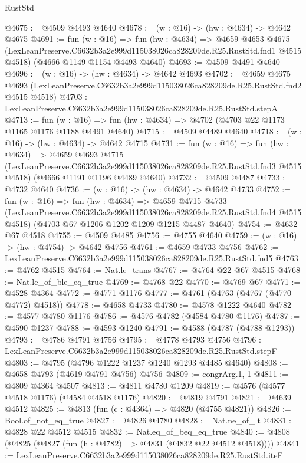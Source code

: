 \begin{lexlean}{RustStd}
\begin{coremodule}
@4675 := @4509 @4493 @4640
@4678 := (w : @16) -> (hw : @4634) -> @4642 @4675
@4691 := fun (w : @16) =>
  fun (hw : @4634) =>
  @4659
    @4653
    @4675
    (LexLeanPreserve.C6632b3a2e999d115038026ca828209de.R25.RustStd.fnd1 @4515 @4518)
    (@4666 @1149 @1154 @4493 @4640)
@4693 := @4509 @4491 @4640
@4696 := (w : @16) -> (hw : @4634) -> @4642 @4693
@4702 := @4659
    @4675
    @4693
    (LexLeanPreserve.C6632b3a2e999d115038026ca828209de.R25.RustStd.fnd2 @4515 @4518)
@4703 := LexLeanPreserve.C6632b3a2e999d115038026ca828209de.R25.RustStd.stepA
@4713 := fun (w : @16) => fun (hw : @4634) => @4702 (@4703 @22 @1173 @1165 @1176 @1188 @4491 @4640)
@4715 := @4509 @4489 @4640
@4718 := (w : @16) -> (hw : @4634) -> @4642 @4715
@4731 := fun (w : @16) =>
  fun (hw : @4634) =>
  @4659
    @4693
    @4715
    (LexLeanPreserve.C6632b3a2e999d115038026ca828209de.R25.RustStd.fnd3 @4515 @4518)
    (@4666 @1191 @1196 @4489 @4640)
@4732 := @4509 @4487
@4733 := @4732 @4640
@4736 := (w : @16) -> (hw : @4634) -> @4642 @4733
@4752 := fun (w : @16) =>
  fun (hw : @4634) =>
  @4659
    @4715
    @4733
    (LexLeanPreserve.C6632b3a2e999d115038026ca828209de.R25.RustStd.fnd4 @4515 @4518)
    (@4703 @67 @1206 @1202 @1209 @1215 @4487 @4640)
@4754 := @4632 @67 @4518
@4755 := @4509 @4485
@4756 := @4755 @4640
@4759 := (w : @16) -> (hw : @4754) -> @4642 @4756
@4761 := @4659 @4733 @4756
@4762 := LexLeanPreserve.C6632b3a2e999d115038026ca828209de.R25.RustStd.fnd5
@4763 := @4762 @4515
@4764 := Nat.le_trans
@4767 := @4764 @22 @67 @4515
@4768 := Nat.le_of_ble_eq_true
@4769 := @4768 @22
@4770 := @4769 @67
@4771 := @4528 @4364
@4772 := @4771 @1176
@4777 := @4761 (@4763 (@4767 (@4770 @4772) @4518))
@4778 := @4658 @4733
@4780 := @4578 @1222 @4640
@4782 := @4577 @4780 @1176
@4786 := @4576 @4782 (@4584 @4780 @1176)
@4787 := @4590 @1237
@4788 := @4593 @1240
@4791 := @4588 (@4787 (@4788 @1293))
@4793 := @4786 @4791 @4756
@4795 := @4778 @4793 @4756
@4796 := LexLeanPreserve.C6632b3a2e999d115038026ca828209de.R25.RustStd.stepF
@4803 := @4795 (@4796 @1222 @1237 @1240 @1293 @4485 @4640)
@4808 := @4658 @4793 (@4619 @4791 @4756) @4756
@4809 := congrArg.{1, 1}
@4811 := @4809 @4364 @4507
@4813 := @4811 @4780 @1209
@4819 := @4576 (@4577 @4518 @1176) (@4584 @4518 @1176)
@4820 := @4819 @4791
@4821 := @4639 @4512
@4825 := @4813 (fun (c : @4364) => @4820 (@4755 @4821))
@4826 := Bool.of_not_eq_true
@4827 := @4826 @4780
@4828 := Nat.ne_of_lt
@4831 := @4828 @22 @4512 @4515
@4832 := Nat.eq_of_beq_eq_true
@4840 := @4808 (@4825 (@4827 (fun (h : @4782) => @4831 (@4832 @22 @4512 @4518))))
@4841 := LexLeanPreserve.C6632b3a2e999d115038026ca828209de.R25.RustStd.iteF

\end{coremodule}
\end{lexlean}
